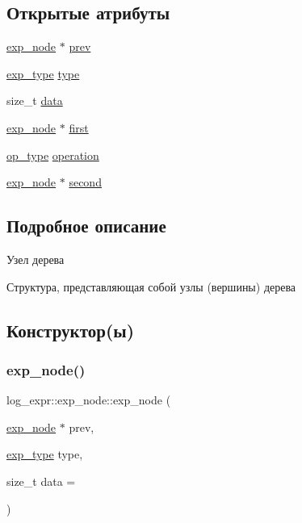\subsection*{Открытые атрибуты}
\begin{DoxyCompactItemize}
\item 
\hyperlink{structlog__expr_1_1exp__node}{exp\+\_\+node} $\ast$ \hyperlink{structlog__expr_1_1exp__node_a628a464ae69a774bdda4e61311384639}{prev}
\item 
\hyperlink{classlog__expr_abfd63d60441373c4017ef250008102d9}{exp\+\_\+type} \hyperlink{structlog__expr_1_1exp__node_a577ddefdceaaf43406988533be4b0b48}{type}
\item 
size\+\_\+t \hyperlink{structlog__expr_1_1exp__node_a9d47049c6feba012a2b982491441c2c7}{data}
\item 
\hyperlink{structlog__expr_1_1exp__node}{exp\+\_\+node} $\ast$ \hyperlink{structlog__expr_1_1exp__node_ae3064add360e9f0802a93e5c08bdf86c}{first}
\item 
\hyperlink{classlog__expr_acef7af5805dc4da8b53854ae7e458351}{op\+\_\+type} \hyperlink{structlog__expr_1_1exp__node_addeb855c783e76cee11f72a9d72bea6e}{operation}
\item 
\hyperlink{structlog__expr_1_1exp__node}{exp\+\_\+node} $\ast$ \hyperlink{structlog__expr_1_1exp__node_a49c94d8b978f57e2b954a793cf69df13}{second}
\end{DoxyCompactItemize}


\subsection{Подробное описание}
Узел дерева 

Структура, представляющая собой узлы (вершины) дерева 

\subsection{Конструктор(ы)}
\mbox{\label{structlog__expr_1_1exp__node_a81102303536ddfb5e5260ccb9f6e2ef6}} 
\subsubsection{\texorpdfstring{exp\+\_\+node()}{exp\_node()}\hspace{0.1cm}{\footnotesize\ttfamily [1/2]}}
{\footnotesize\ttfamily log\+\_\+expr\+::exp\+\_\+node\+::exp\+\_\+node (\begin{DoxyParamCaption}\item[{\hyperlink{structlog__expr_1_1exp__node}{exp\+\_\+node} $\ast$}]{prev,  }\item[{\hyperlink{classlog__expr_abfd63d60441373c4017ef250008102d9}{exp\+\_\+type}}]{type,  }\item[{size\+\_\+t}]{data = {} }\end{DoxyParamCaption})}


